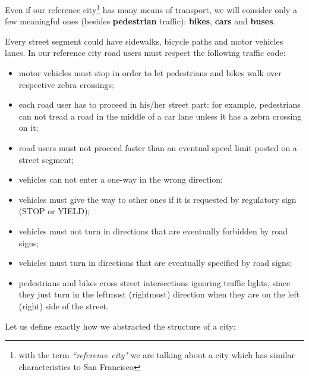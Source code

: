 Even if our reference city\footnote{with the term \emph{``reference city"}
we are talking about a city which has similar characteristics to San
Francisco} has many means of transport, we will consider only a few meaningful
ones (besides \textbf{pedestrian} traffic): \textbf{bikes}, \textbf{cars} and
\textbf{buses}.

Every street segment could have sidewalks, bicycle paths and motor vehicles
lanes. In our reference city road users must respect the following traffic
code:

\begin{itemize}
\item motor vehicles must stop in order to let pedestrians and bikes walk over
  respective zebra crossings;
\item each road user has to proceed in his/her street part: for example,
  pedestrians can not tread a road in the middle of a car lane unless it has a
  zebra crossing on it;
\item road users must not proceed faster than an eventual speed limit posted
  on a street segment;
\item vehicles can not enter a one-way in the wrong direction;
\item vehicles must give the way to other ones if it is requested by
  regulatory sign (STOP or YIELD);
\item vehicles must not turn in directions that are eventually forbidden by
  road signs;
\item vehicles must turn in directions that are eventually specified by road
  signs;
\item pedestrians and bikes cross street intersections ignoring traffic lights,
  since they just turn in the leftmost (rightmost) direction when they are on
  the left (right) side of the street.
\end{itemize}

Let us define exactly how we abstracted the structure of a city:

